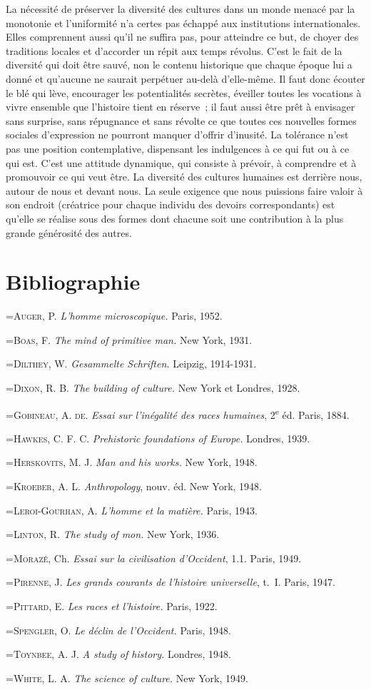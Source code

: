 \documentclass[french,twoside]{book} %
\newcommand\surname[1]{\textsc{#1}}
\newcommand{\biblitem}[1]{{\noindent\hangindent=\parindent   #1\par}}
\begin{document}
La nécessité de préserver la diversité des cultures dans un monde menacé par la monotonie et l’uniformité n’a certes pas échappé aux institutions internationales. Elles comprennent aussi qu’il ne suffira pas, pour atteindre ce but, de choyer des traditions locales et d’accorder un répit aux temps révolus. C’est le fait de la diversité qui doit être sauvé, non le contenu historique que chaque époque lui a donné et qu’aucune ne saurait perpétuer au-delà d’elle-même. Il faut donc écouter le blé qui lève, encourager les potentialités secrètes, éveiller toutes les vocations à vivre ensemble que l’histoire tient en réserve ; il faut aussi être prêt à envisager sans surprise, sans répugnance et sans révolte ce que toutes ces nouvelles formes sociales d’expression ne pourront manquer d’offrir d’inusité. La tolérance n’est pas une position contemplative, dispensant les indulgences à ce qui fut ou à ce qui est. C’est une attitude dynamique, qui consiste à prévoir, à comprendre et à promouvoir ce qui veut être. La diversité des cultures humaines est derrière nous, autour de nous et devant nous. La seule exigence que nous puissions faire valoir à son endroit (créatrice pour chaque individu des devoirs correspondants) est qu’elle se réalise sous des formes dont chacune soit une contribution à la plus grande générosité des autres.

\section[{Bibliographie}]{Bibliographie}
\renewcommand{\leftmark}{Bibliographie}

\biblitem{\surname{Auger}, P. \emph{L’homme microscopique.} Paris, 1952.}
\biblitem{\surname{Boas}, F. \emph{The mind of primitive man.} New York, 1931.}
\biblitem{\surname{Dilthey}, W. \emph{Gesammelte Schriften.} Leipzig, 1914-1931.}
\biblitem{\surname{Dixon}, R. B. \emph{The building of culture.} New York et Londres, 1928.}
\biblitem{\surname{Gobineau, A. de.} \emph{Essai sur l’inégalité des races humaines}, 2\textsuperscript{e} éd. Paris, 1884.}
\biblitem{\surname{Hawkes}, C. F. C. \emph{Prehistoric foundations of Europe.} Londres, 1939.}
\biblitem{\surname{Herskovits}, M. J. \emph{Man and his works.} New York, 1948.}
\biblitem{\surname{Kroeber}, A. L. \emph{Anthropology}, nouv. éd. New York, 1948.}
\biblitem{\surname{Leroi-Gourhan}, A. \emph{L’homme et la matière.} Paris, 1943.}
\biblitem{\surname{Linton}, R. \emph{The study of mon.} New York, 1936.}
\biblitem{\surname{Morazé}, Ch. \emph{Essai sur la civilisation d’Occident}, 1.1. Paris, 1949.}
\biblitem{\surname{Pirenne}, J. \emph{Les grands courants de l’histoire universelle}, t. I. Paris, 1947.}
\biblitem{\surname{Pittard}, E. \emph{Les races et l’histoire.} Paris, 1922.}
\biblitem{\surname{Spengler}, O. \emph{Le déclin de l’Occident.} Paris, 1948.}
\biblitem{\surname{Toynbee}, A. J. \emph{A study of history.} Londres, 1948.}
\biblitem{\surname{White}, L. A. \emph{The science of culture.} New York, 1949.}
 
\end{document}
